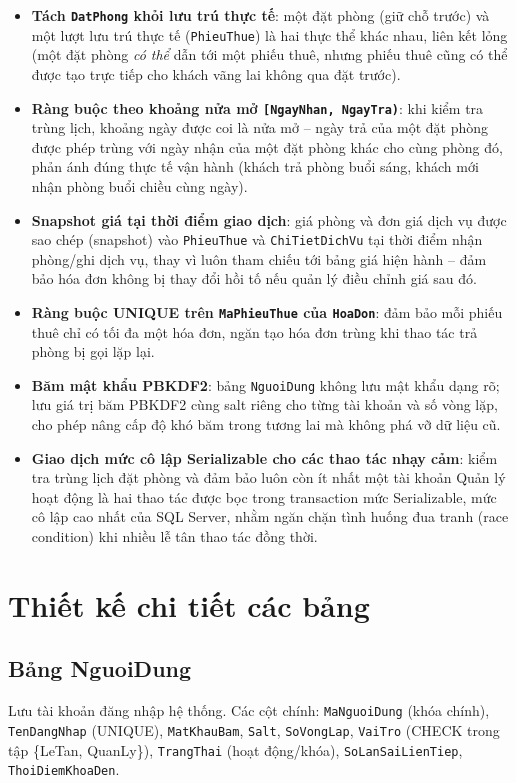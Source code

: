 \documentclass[14pt]{report}
\begin{document}
\begin{itemize}
  \item \textbf{Tách \texttt{DatPhong} khỏi lưu trú thực tế}: một đặt phòng (giữ chỗ trước) và một lượt lưu trú thực tế (\texttt{PhieuThue}) là hai thực thể khác nhau, liên kết lỏng (một đặt phòng \emph{có thể} dẫn tới một phiếu thuê, nhưng phiếu thuê cũng có thể được tạo trực tiếp cho khách vãng lai không qua đặt trước).
  \item \textbf{Ràng buộc theo khoảng nửa mở \texttt{[NgayNhan, NgayTra)}}: khi kiểm tra trùng lịch, khoảng ngày được coi là nửa mở -- ngày trả của một đặt phòng được phép trùng với ngày nhận của một đặt phòng khác cho cùng phòng đó, phản ánh đúng thực tế vận hành (khách trả phòng buổi sáng, khách mới nhận phòng buổi chiều cùng ngày).
  \item \textbf{Snapshot giá tại thời điểm giao dịch}: giá phòng và đơn giá dịch vụ được sao chép (snapshot) vào \texttt{PhieuThue} và \texttt{ChiTietDichVu} tại thời điểm nhận phòng/ghi dịch vụ, thay vì luôn tham chiếu tới bảng giá hiện hành -- đảm bảo hóa đơn không bị thay đổi hồi tố nếu quản lý điều chỉnh giá sau đó.
  \item \textbf{Ràng buộc UNIQUE trên \texttt{MaPhieuThue} của \texttt{HoaDon}}: đảm bảo mỗi phiếu thuê chỉ có tối đa một hóa đơn, ngăn tạo hóa đơn trùng khi thao tác trả phòng bị gọi lặp lại.
  \item \textbf{Băm mật khẩu PBKDF2}: bảng \texttt{NguoiDung} không lưu mật khẩu dạng rõ; lưu giá trị băm PBKDF2 cùng salt riêng cho từng tài khoản và số vòng lặp, cho phép nâng cấp độ khó băm trong tương lai mà không phá vỡ dữ liệu cũ.
  \item \textbf{Giao dịch mức cô lập Serializable cho các thao tác nhạy cảm}: kiểm tra trùng lịch đặt phòng và đảm bảo luôn còn ít nhất một tài khoản Quản lý hoạt động là hai thao tác được bọc trong transaction mức Serializable, mức cô lập cao nhất của SQL Server, nhằm ngăn chặn tình huống đua tranh (race condition) khi nhiều lễ tân thao tác đồng thời.
\end{itemize}

\section{Thiết kế chi tiết các bảng}

\subsection{Bảng NguoiDung}
Lưu tài khoản đăng nhập hệ thống. Các cột chính: \texttt{MaNguoiDung} (khóa chính), \texttt{TenDangNhap} (UNIQUE), \texttt{MatKhauBam}, \texttt{Salt}, \texttt{SoVongLap}, \texttt{VaiTro} (CHECK trong tập \{LeTan, QuanLy\}), \texttt{TrangThai} (hoạt động/khóa), \texttt{SoLanSaiLienTiep}, \texttt{ThoiDiemKhoaDen}.
\end{document}

